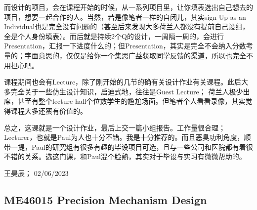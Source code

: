 而设计的项目，会在课程开始的时候，从一系列项目里，让你填表选出自己想去的项目，想要一起合作的人。当然，若是像笔者一样的自闭儿，其实sign Up as an Individual也是完全没有问题的（甚至后来发现大多荷兰人都没有提前自己设组，全是个人身份填表）。而后就是持续2个Q的设计，一周隔一周的，会进行Presentation，汇报一下进度什么的；但Presentation，其实是完全不会纳入分数考量的；字面意思的，仅仅是给你一个集思广益获取同学反馈的渠道，所以也完全不用担心吧。

课程期间也会有Lecture，除了刚开始的几节的确有关设计作业有关课程。此后大多完全关于一些仿生设计知识，启迪式地，往往是Guest Lecture； 荷兰人极少出席，甚至有整个lecture hall个位数学生的尴尬场面。但笔者个人看看录像，其实觉得课程大多还蛮有价值的。

总之，这课就是一个设计作业，最后上交一篇小组报告。工作量很合理；Lecturer，也就是Paul为人也十分不错。我是十分推荐的。而且恶臭功利角度，顺带一提，Paul的研究组有很多有趣的毕设项目可选，且与一些公司和医院都有着很不错的关系。选这门课，和Paul混个脸熟，其实对于毕设与实习有微微帮助的。
\begin{flushright}
王昊辰； 02/06/2023
\end{flushright}

\subsection{ME46015 Precision Mechanism Design}



